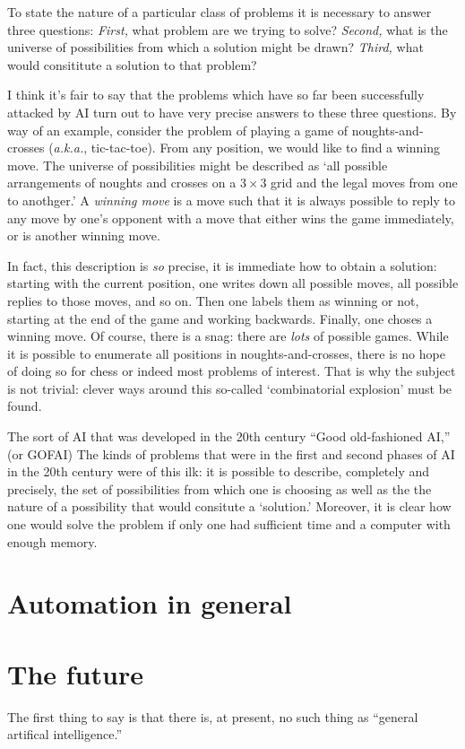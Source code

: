 \documentclass[10pt, a4paper, twocolumn]{article}
\begin{document}
To state the nature of a particular class of problems it is necessary to answer
three questions: \emph{First,} what problem are we trying to solve?
\emph{Second,} what is the universe of possibilities from which a solution might
be drawn? \emph{Third,} what would consititute a solution to that problem?

I think it's fair to say that the problems which have so far been successfully
attacked by AI turn out to have very precise answers to these three
questions. By way of an example, consider the problem of playing a game of
noughts-and-crosses (\emph{a.k.a.}, tic-tac-toe). From any position, we would
like to find a winning move. The universe of possibilities might be described as
`all possible arrangements of noughts and crosses on a $3\times3$ grid and the legal
moves from one to anothger.' A \emph{winning move} is a move such that it is
always possible to reply to any move by one's opponent with a move that either
wins the game immediately, or is another winning move.

In fact, this description is \emph{so} precise, it is immediate how to obtain a
solution: starting with the current position, one writes down all possible
moves, all possible replies to those moves, and so on. Then one labels them as
winning or not, starting at the end of the game and working backwards. Finally,
one choses a winning move. Of course, there is a snag: there are \emph{lots} of
possible games. While it is possible to enumerate all positions in
noughts-and-crosses, there is no hope of doing so for chess or indeed most
problems of interest. That is why the subject is not trivial: clever ways around
this so-called `combinatorial explosion' must be found.

The sort of AI that was developed in the 20th century ``Good old-fashioned AI,'' (or GOFAI) The kinds of problems that were in the
first and second phases of AI in the 20th century were of this ilk: it is
possible to describe, completely and precisely, the set of possibilities from
which one is choosing as well as the the nature of a possibility that would
consitute a `solution.'  Moreover, it is clear how one would solve the problem
if only one had sufficient time and a computer with enough memory.








\section{Automation in general}

\section{The future}

The first thing to say is that there is, at present, no such thing as ``general
artifical intelligence.''
\end{document}
